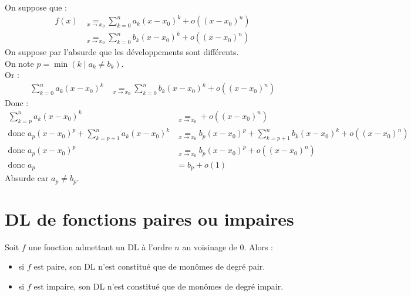 \documentclass[../main.tex]{subfiles}
\begin{document}
\noindent On suppose que : 
\begin{align*}
    f(x) &\underset{x\to x_0}{=} \sum_{k=0}^{n} a_k (x - x_0)^k + o((x - x_0)^n) \\
    &\underset{x\to x_0}{=} \sum_{k=0}^{n} b_k (x - x_0)^k + o((x - x_0)^n) 
\end{align*}
On suppose par l'absurde que les développements sont différents. \\
On note $p = \min (k \mid a_k \neq b_k)$. \\
Or : 
\begin{align*}
    \sum_{k=0}^{n} a_k (x - x_0)^k &\underset{x\to x_0}{=} \sum_{k=0}^{n} b_k (x - x_0)^k + o((x - x_0)^n)
\end{align*}
Donc : 
\begin{align*}
    \sum_{k=p}^{n} a_k(x - x_0)^k &\underset{x\to x_0}{=} + o((x - x_0)^n) \\
    \text{donc } a_p (x - x_0)^p + \sum_{k=p+1}^{n} a_k(x - x_0)^k &\underset{x\to x_0}{=} b_p(x - x_0)^p + \sum_{k=p+1}^{n} b_k(x - x_0)^k + o((x - x_0)^n) \\
    \text{donc } a_p (x - x_0)^p &\underset{x\to x_0}{=} b_p(x - x_0)^p + o((x - x_0)^n) \\
    \text{donc } a_p &= b_p + o(1)
\end{align*}
Absurde car $a_p \neq b_p$.

\section{DL de fonctions paires ou impaires}
\begin{tcolorbox}[title=Propostion 25.41, title filled=false, colframe=lightblue, colback=lightblue!10!white]
    Soit $f$ une fonction admettant un DL à l'ordre $n$ au voisinage de $0$. Alors : 
    \begin{itemize}
        \item si $f$ est paire, son DL n'est constitué que de monômes de degré pair. 
        \item si $f$ est impaire, son DL n'est constitué que de monômes de degré impair. 
    \end{itemize}
\end{tcolorbox}
\end{document}
